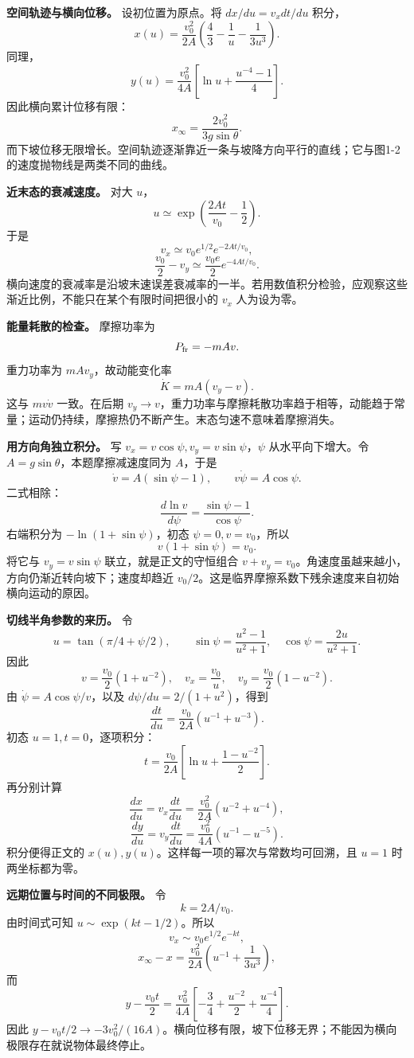 \documentclass[12pt,a4paper,UTF8]{ctexart}
\begin{document}
\textbf{空间轨迹与横向位移。} 设初位置为原点。将 \(dx/du=v_xdt/du\)
积分， \[
x(u)=\frac{v_0^2}{2A}
\left(\frac43-\frac1u-\frac1{3u^3}\right).
\] 同理， \[
y(u)=\frac{v_0^2}{4A}
\left[\ln u+\frac{u^{-4}-1}{4}\right].
\] 因此横向累计位移有限： \[
\boxed{x_\infty=\frac{2v_0^2}{3g\sin\theta}}.
\]
而下坡位移无限增长。空间轨迹逐渐靠近一条与坡降方向平行的直线；它与图1-2的速度抛物线是两类不同的曲线。

\textbf{近末态的衰减速度。} 对大 \(u\)， \[
u\simeq \exp\left(\frac{2At}{v_0}-\frac12\right).
\] 于是 \[
v_x\simeq v_0e^{1/2}e^{-2At/v_0},
\] \[
\frac{v_0}2-v_y\simeq\frac{v_0e}{2}e^{-4At/v_0}.
\]
横向速度的衰减率是沿坡末速误差衰减率的一半。若用数值积分检验，应观察这些渐近比例，不能只在某个有限时间把很小的
\(v_x\) 人为设为零。

\textbf{能量耗散的检查。} 摩擦功率为 \[
P_{\rm fr}=-mAv.
\] 重力功率为 \(mAv_y\)，故动能变化率 \[
\dot K=mA(v_y-v).
\] 这与 \(mv\dot v\) 一致。在后期
\(v_y\to v\)，重力功率与摩擦耗散功率趋于相等，动能趋于常量；运动仍持续，摩擦热仍不断产生。末态匀速不意味着摩擦消失。

\textbf{用方向角独立积分。} 写 \(v_x=v\cos\psi,v_y=v\sin\psi\)，\(\psi\)
从水平向下增大。令 \(A=g\sin\theta\)，本题摩擦减速度同为 \(A\)，于是 \[
\dot v=A(\sin\psi-1),\qquad
v\dot\psi=A\cos\psi.
\] 二式相除： \[
\frac{d\ln v}{d\psi}=\frac{\sin\psi-1}{\cos\psi}.
\] 右端积分为 \(-\ln(1+\sin\psi)\)，初态 \(\psi=0,v=v_0\)，所以 \[
v(1+\sin\psi)=v_0.
\] 将它与 \(v_y=v\sin\psi\) 联立，就是正文的守恒组合
\(v+v_y=v_0\)。角速度虽越来越小，方向仍渐近转向坡下；速度却趋近
\(v_0/2\)。这是临界摩擦系数下残余速度来自初始横向运动的原因。

\textbf{切线半角参数的来历。} 令 \[
u=\tan(\pi/4+\psi/2),\qquad
\sin\psi=\frac{u^2-1}{u^2+1},\quad
\cos\psi=\frac{2u}{u^2+1}.
\] 因此 \[
v=\frac{v_0}{2}(1+u^{-2}),\quad
v_x=\frac{v_0}{u},\quad
v_y=\frac{v_0}{2}(1-u^{-2}).
\] 由 \(\dot\psi=A\cos\psi/v\)，以及 \(d\psi/du=2/(1+u^2)\)，得到 \[
\frac{dt}{du}=\frac{v_0}{2A}(u^{-1}+u^{-3}).
\] 初态 \(u=1,t=0\)，逐项积分： \[
t=\frac{v_0}{2A}\left[\ln u+\frac{1-u^{-2}}2\right].
\] 再分别计算 \[
\frac{dx}{du}=v_x\frac{dt}{du}
=\frac{v_0^2}{2A}(u^{-2}+u^{-4}),
\] \[
\frac{dy}{du}=v_y\frac{dt}{du}
=\frac{v_0^2}{4A}(u^{-1}-u^{-5}).
\] 积分便得正文的 \(x(u),y(u)\)。这样每一项的幂次与常数均可回溯，且
\(u=1\) 时两坐标都为零。

\textbf{远期位置与时间的不同极限。} 令 \[
k=2A/v_0.
\] 由时间式可知 \(u\sim\exp(kt-1/2)\)。所以 \[
v_x\sim v_0e^{1/2}e^{-kt},
\] \[
x_\infty-x
=\frac{v_0^2}{2A}\left(u^{-1}+\frac1{3u^3}\right),
\] 而 \[
y-\frac{v_0t}{2}
=\frac{v_0^2}{4A}
\left[-\frac34+\frac{u^{-2}}2+\frac{u^{-4}}4\right].
\] 因此
\(y-v_0t/2\to-3v_0^2/(16A)\)。横向位移有限，坡下位移无界；不能因为横向极限存在就说物体最终停止。
\end{document}
